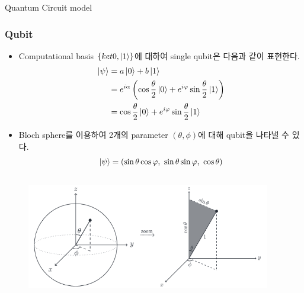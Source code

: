 \documentclass[9pt]{beamer}
\begin{document}
\begin{section}{Quantum Circuit model}
\begin{frame}
\begin{itemize}
            \end{itemize}
        
        \end{frame}

        \begin{frame}
            \frametitle{Qubit}
            \begin{itemize}
                \item Computational basis $\{ket 0, \ket 1\}$에 대하여 single qubit은 다음과 같이 표현한다.
                $$ \begin{aligned} \ket \psi &= a \ket 0 + b \ket 1  \\  &= e^{i\alpha} \left( \cos \frac{\theta}{2} \ket 0 + e^{i \varphi} \sin \frac{\theta}{2}  \ket 1 \right) \\&= \cos\frac{\theta}{2} \ket 0 + e^{i \varphi} \sin\frac{\theta}{2} \ket 1\end{aligned}$$ 
                \item Bloch sphere를 이용하여 2개의 parameter $(\theta, \phi)$에 대해 qubit을 나타낼 수 있다.
                $$\ket{\psi} = (\sin \theta \cos \varphi,\ \sin \theta \sin \varphi,\ \cos \theta)$$
            \end{itemize}    
            \begin{columns}
                \begin{column}{0.65\textwidth}
                    \begin{figure}
                        \centering
                        \includegraphics[width=0.95\columnwidth]{image/L4_bloch_1.png}
                    \end{figure}
                \end{column}
                \begin{column}{0.35\textwidth}
                    

\end{column}
\end{columns}
\end{frame}
\end{section}
\end{document}
